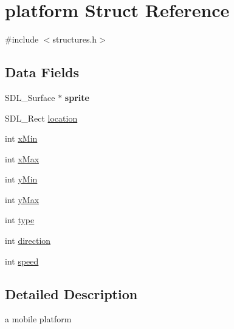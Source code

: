 \hypertarget{structplatform}{\section{platform Struct Reference}
\label{structplatform}
}


{\ttfamily \#include $<$structures.\-h$>$}

\subsection*{Data Fields}
\begin{DoxyCompactItemize}
\item 
\hypertarget{structplatform_a1c7252614a33238e51edd3bbd5fa08c5}{S\-D\-L\-\_\-\-Surface $\ast$ {\bfseries sprite}}\label{structplatform_a1c7252614a33238e51edd3bbd5fa08c5}

\item 
S\-D\-L\-\_\-\-Rect \hyperlink{structplatform_a08e7ab1c2395b84bea7ca13eb99bac60}{location}
\item 
int \hyperlink{structplatform_aa91afe2b50db2f2fc786f4caf9f16f69}{x\-Min}
\item 
int \hyperlink{structplatform_af201ccbf3fe6a7e8274aa3eca22ac711}{x\-Max}
\item 
int \hyperlink{structplatform_abd0259c29e89b8f4ee318478bf207cf8}{y\-Min}
\item 
int \hyperlink{structplatform_a7ca443cbb568e95510880b6ec54dbe5e}{y\-Max}
\item 
int \hyperlink{structplatform_ac765329451135abec74c45e1897abf26}{type}
\item 
int \hyperlink{structplatform_a886d551d5381dc3e53f17825ffc51641}{direction}
\item 
int \hyperlink{structplatform_a218b4f7c6cc2681a99c23a3b089d68b1}{speed}
\end{DoxyCompactItemize}


\subsection{Detailed Description}
a mobile platform 

